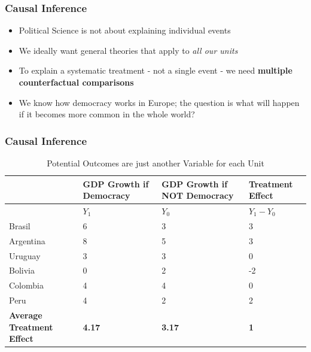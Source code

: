 \documentclass[xcolor=x11names,compress]{beamer}\usepackage[]{graphicx}\usepackage[]{color}
\renewcommand{\(}{\begin{columns}}
\renewcommand{\)}{\end{columns}}
\newcommand{\<}[1]{\begin{column}{#1}}
\renewcommand{\>}{\end{column}}
\begin{document}
\begin{frame}
\frametitle{Causal Inference}
\begin{itemize}
\item Political Science is not about explaining individual events
\pause
\item We ideally want general theories that apply to \textit{all our units}
\pause
\item To explain a systematic treatment - not a single event - we need \textbf{multiple counterfactual comparisons}
\pause
\item We know how democracy works in Europe; the question is what will happen if it becomes more common in the whole world?
\pause
{}
\end{itemize}
\end{frame}

\begin{frame}
\frametitle{Causal Inference}
\footnotesize
\begin{table}[htbp]
  \centering
  \caption{Potential Outcomes are just another Variable for each Unit}
    \begin{tabular}{|p{2.4cm}|p{2.4cm}|p{2.4cm}|p{2.4cm}|}
    \hline
          & \multicolumn{1}{p{2.4cm}|}{GDP Growth if Democracy} & \multicolumn{1}{p{2.4cm}|}{GDP Growth if  NOT Democracy} &  Treatment Effect\bigstrut\\
    \hline
          & \multicolumn{1}{l|}{$Y_1$} & \multicolumn{1}{l|}{$Y_0$} & \multicolumn{1}{l|}{$Y_1-Y_0$} \bigstrut\\
    \hline
    Brasil & 6     & 3     & 3 \bigstrut\\
    \hline
    Argentina & 8    & 5     & 3 \bigstrut\\
    \hline
    Uruguay & 3 & 3 & 0  \bigstrut\\
    \hline
    Bolivia & 0     & 2     & -2 \bigstrut\\
    \hline
    Colombia & 4    & 4    & 0 \bigstrut\\
    \hline
    Peru & 4     & 2     & 2 \bigstrut\\
    \hline
    \textbf{Average Treatment Effect} & \textbf{4.17} & \textbf{3.17} & \textbf{1}   \bigstrut\\
    \hline
    \end{tabular}%
  \label{tab:addlabel}%
\end{table}%
\normalsize
\end{frame}
\end{document}
